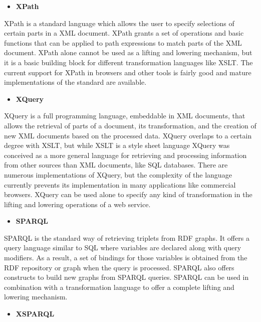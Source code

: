 \begin{itemize}
\item \bf{XPath}
\end{itemize}

XPath is a standard language which allows the user to specify selections of certain parts in a XML document. XPath grants a set of operations and basic functions that can be applied to path expressions to match parts of the XML document. XPath alone cannot be used as a lifting and lowering mechanism, but it is a basic building block for different transformation languages like XSLT. The current support for XPath in browsers and other tools is fairly good and mature implementations of the standard are available.

\begin{itemize}
\item \bf{XQuery}
\end{itemize}

XQuery is a full programming language, embeddable in XML documents, that allows the retrieval of parts of a document, its transformation, and the creation of new XML documents based on the processed data. XQuery overlaps to a certain degree with XSLT, but while XSLT is a style sheet language XQuery was conceived as a more general language for retrieving and processing information from other sources than XML documents, like SQL databases. There are numerous implementations of XQuery, but the complexity of the language currently prevents its implementation in many applications like commercial browsers. XQuery can be used alone to specify any kind of transformation in the lifting and lowering operations of a web service.

\begin{itemize}
\item \bf{SPARQL}
\end{itemize}

SPARQL is the standard way of retrieving triplets from RDF graphs. It offers a query language similar to SQL where variables are declared along with query modifiers. As a result, a set of bindings for those variables is obtained from the RDF repository or graph when the query is processed. SPARQL also offers constructs to build new graphs from SPARQL queries. SPARQL can be used in combination with a transformation language to offer a complete lifting and lowering mechanism.

\begin{itemize}
\item \bf{XSPARQL}
\end{itemize}

